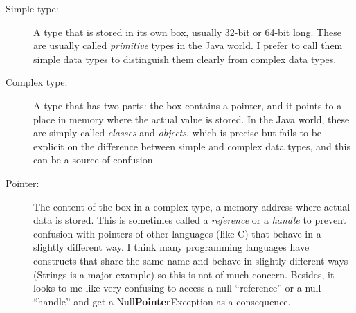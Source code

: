 \begin{description}
\item[Simple type: ] A type that is stored in its own box, usually
  32-bit or 64-bit long. These are usually called \emph{primitive}
  types in the Java world. I prefer to call them simple data types to
  distinguish them clearly from complex data types.
\item[Complex type: ] A type that has two parts: the box contains a
  pointer, and it points to a place in memory where the actual value
  is stored. In the Java world, these are simply called \emph{classes}
  and \emph{objects}, which is precise but fails to be explicit on the
  difference between simple and complex data types, and this can be a
  source of confusion.
\item[Pointer: ] The content of the box in a complex type, a memory
  address where actual data is stored. This is sometimes called a
  \emph{reference} or a \emph{handle} to prevent confusion with
  pointers of other languages (like C) that behave in a slightly
  different way. I think many programming languages have constructs
  that share the same name and behave in slightly different ways
  (Strings is a major example) so this is not of much
  concern. Besides, it looks to me like very confusing to 
  access a null ``reference'' or a null ``handle'' and 
  get a Null\textbf{Pointer}Exception as a consequence. 
\end{description}





